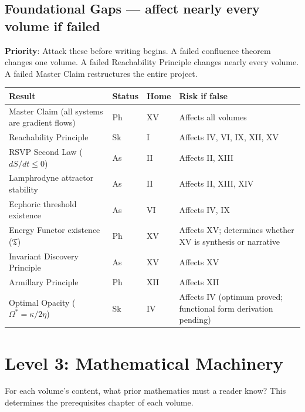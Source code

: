 \documentclass[11pt, a4paper]{article}
\begin{document}
\subsection{Foundational Gaps --- affect nearly every volume if failed}

\begin{notebox}
\textbf{Priority}: Attack these before writing begins. A failed
confluence theorem changes one volume. A failed Reachability Principle
changes nearly every volume. A failed Master Claim restructures
the entire project.
\end{notebox}

\medskip
\begin{longtable}{p{5cm}lp{1.5cm}p{3.8cm}}
\toprule
\textbf{Result} & \textbf{Status} & \textbf{Home} & \textbf{Risk if false} \\
\midrule
Master Claim (all systems are gradient flows) & Ph & XV & Affects all volumes \\
Reachability Principle & Sk & I & Affects IV, VI, IX, XII, XV \\
RSVP Second Law ($dS/dt \leq 0$) & As & II & Affects II, XIII \\
Lamphrodyne attractor stability & As & II & Affects II, XIII, XIV \\
Ecphoric threshold existence & As & VI & Affects IV, IX \\
Energy Functor existence ($\mathfrak{T}$) & Ph & XV & Affects XV; determines
  whether XV is synthesis or narrative \\
Invariant Discovery Principle & As & XV & Affects XV \\
Armillary Principle & Ph & XII & Affects XII \\
Optimal Opacity ($\Omega^* = \kappa/2\eta$) & Sk & IV & Affects IV (optimum proved; functional form derivation pending) \\
\bottomrule
\end{longtable}



\section{Level 3: Mathematical Machinery}

For each volume's content, what prior mathematics must a reader know?
This determines the prerequisites chapter of each volume.
\end{document}

